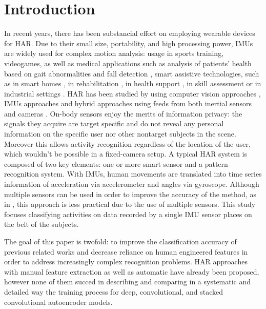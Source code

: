 
\section{Introduction}
\label{sec:introduction}

In recent years, there has been substancial effort on employing wearable devices for HAR. Due to their small size, portability, and high processing power, IMUs are widely used for complex motion analysis: usage in sports training, videogames, as well as medical applications such as analysis of patients' health based on gait abnormalities and fall detection \cite{Yamada-2012}, smart assistive technologies, such as in smart homes \cite{Parisa-2009}, in rehabilitation \cite{Shyamal-2012}, in health support \cite{Akin-2010}, in skill assessment \cite{Matthias-2013} or in industrial settings \cite{Thomas-2008}.
HAR has been studied by using computer vision approaches \cite{Hueihan-2013,Ferda-2013}, IMUs approaches \cite{jian-2015,nils-2016,Valarezo-2017} and hybrid approaches using feeds from both inertial sensors and cameras \cite{2017-mfi-actionrecognition}.
\mbox{On-body} sensors enjoy the merits of information privacy: the signals they acquire are target specific and do not reveal any personal information on the specific user nor other nontarget subjects in the scene. Moreover this allows activity recognition regardless of the location of the user, which wouldn't be possible in a \mbox{fixed-camera} setup.
A typical HAR system is composed of two key elements: one or more smart sensor and a pattern recognition system. With IMUs, human movements are translated into time series information of acceleration via accelerometer and angles via gyroscope. Although multiple sensors can be used in order to improve the accuracy of the method, as in \cite{Grzezick-2017}, this approach is less practical due to the use of multiple sensors. This study focuses classifying activities on data recorded by a single IMU sensor places on the belt of the subjects. \par
The goal of this paper is twofold: to improve the classification accuracy of previous related works and decrease reliance on human engineered features in order to address increasingly complex recognition problems.
HAR approaches with manual feature extraction \cite{base-paper} as well as automatic \cite{jian-2015, nils-2016, Valarezo-2017} have already been proposed, however none of them succed in describing and comparing in a systematic and detailed way the training process for deep, convolutional, and stacked convolutional autoencoder models. \par
